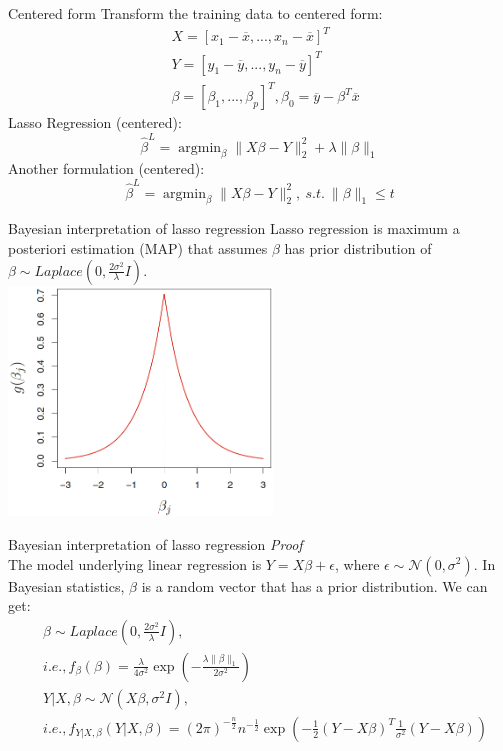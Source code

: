 \documentclass{beamer}
\begin{document}
	\begin{frame}{Centered form}
		Transform the training data to centered form:
		\begin{align*}
			&X=[x_1-\overline{x},...,x_n-\overline{x}]^T \\
			&Y=[y_1-\overline{y}, ..., y_n-\overline{y}]^T \\
			&\beta=[\beta_1, ..., \beta_p]^T, \beta_0=\overline{y}-\beta^T\overline{x}
		\end{align*}
		Lasso Regression (centered):
		\begin{equation*}
			\hat{\beta}^L = \mathop{\arg\min}_{\beta} \|X\beta-Y\|_2^2 + \lambda \|\beta\|_1
		\end{equation*}
		Another formulation (centered):
		\begin{equation*}
			\hat{\beta}^L = \mathop{\arg\min}_{\beta} \|X\beta-Y\|_2^2,\ s.t.\ \|\beta\|_1 \leq t
		\end{equation*}
	\end{frame}
	
	\begin{frame}{Bayesian interpretation of lasso regression}
		Lasso regression is maximum a posteriori estimation (MAP) that assumes $\beta$ has prior distribution of $\beta \sim Laplace(0, \frac{2\sigma^2}{\lambda}I)$. \\
		\vspace{0.5cm}
		\includegraphics[width=7cm]{figure_6.11_2.png}
	\end{frame}
	
	\begin{frame}{Bayesian interpretation of lasso regression}
		\textit{Proof} \\
		The model underlying linear regression is $Y=X\beta+\epsilon$, where $\epsilon \sim \mathcal{N}(0, \sigma^2)$. In Bayesian statistics, $\beta$ is a random vector that has a prior distribution. We can get:
		\begin{align*}
			&\beta \sim Laplace(0, \frac{2\sigma^2}{\lambda} I), \\
			&i.e., f_\beta(\beta)=\frac{\lambda}{4\sigma^2}\exp(-\frac{\lambda\|\beta\|_1}{2\sigma^2})\\
			&Y|X,\beta \sim \mathcal{N}(X\beta, \sigma^2I), \\
			&i.e., f_{Y|X,\beta}(Y|X,\beta)=(2\pi)^{-\frac{n}{2}}n^{-\frac{1}{2}}\exp(-\frac{1}{2}(Y-X\beta)^T\frac{1}{\sigma^2}(Y-X\beta))
		\end{align*}
	\end{frame}
	
\end{document}
